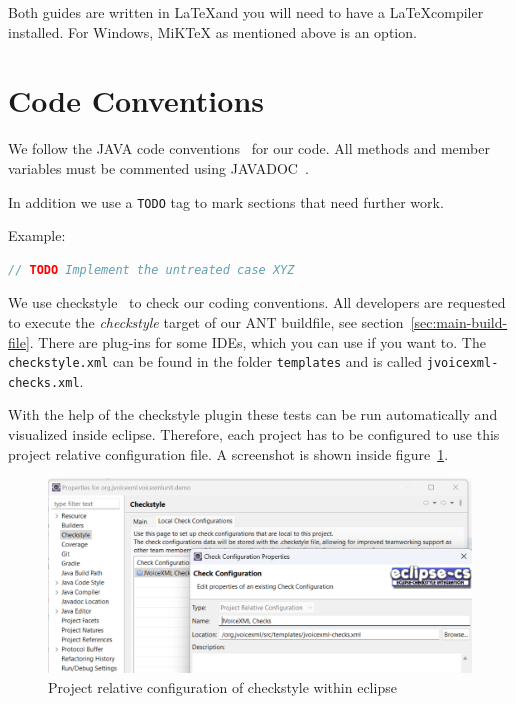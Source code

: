 \documentclass[11pt,a4paper]{article}
\begin{document}
Both guides are written in \LaTeX and you will need to have a \LaTeX compiler
installed. For Windows, MiKTeX as mentioned above is an option.


\section{Code Conventions}
\label{sec:code-conventions}

We follow the JAVA code conventions~\cite{sun:codeconv} for our code. All
methods and member variables must be commented using 
JAVADOC~\cite{sun:javadoc_guidelines}.

In addition we use a \texttt{TODO} tag to mark sections that need further work.

Example:

\begin{lstlisting}[language=Java]
// TODO Implement the untreated case XYZ
\end{lstlisting}

We use checkstyle~\cite{checkstyle} to check our coding conventions.
All developers are requested to execute the \emph{checkstyle} target
of our ANT buildfile, see section~\ref{sec:main-build-file}. 
There are plug-ins for some IDEs, which you can use if you want to. The
\texttt{checkstyle.xml} can be found in the folder 
\texttt{templates} and is called \texttt{jvoicexml-checks.xml}.

With the help of the checkstyle plugin these tests can be run automatically
and visualized inside eclipse. Therefore, each project has to be configured to
use this project relative configuration file. A screenshot is shown inside
figure~\ref{fig:eclipse-project-checkstyle}.
\begin{figure}
\includegraphics[width=\linewidth]{eclipse-project-checkstyle.png}
\caption{Project relative configuration of checkstyle within eclipse}
\label{fig:eclipse-project-checkstyle}
\end{figure}
\end{document}
